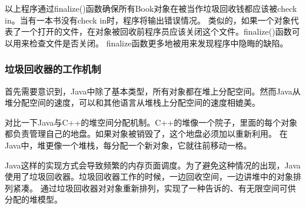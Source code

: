 \documentclass[a4paper,left=2.5cm,right=2.5cm,11pt]{article}
\begin{document}
	以上程序通过finalize()函数确保所有Book对象在被当作垃圾回收钱都应该被check in。当有一本书没有check in时，程序将输出错误情况。
	类似的，如果一个对象代表了一个打开的文件，在对象被回收前程序员应该关闭这个文件。finalize()函数可以用来检查文件是否关闭。
	finalize函数更多地被用来发现程序中隐晦的缺陷。

\subsubsection{垃圾回收器的工作机制}
	首先需要意识到，Java中除了基本类型，所有对象都在堆上分配空间。然而Java从堆分配空间的速度，可以和其他语言从堆栈上分配空间的速度相媲美。\par
	对比一下Java与C++的堆空间分配机制。C++的堆像一个院子，里面的每个对象都负责管理自己的地盘。如果对象被销毁了，这个地盘必须加以重新利用。
	在Java中，堆更像一个堆栈，每分配一个新对象，它就往前移动一格。\par
	Java这样的实现方式会导致频繁的内存页面调度。为了避免这种情况的出现，Java使用了垃圾回收器。垃圾回收器工作的时候，一边回收空间，一边讲堆中的对象排列紧凑。
	通过垃圾回收器对对象重新排列，实现了一种告诉的、有无限空间可供分配的堆模型。
\end{document}

